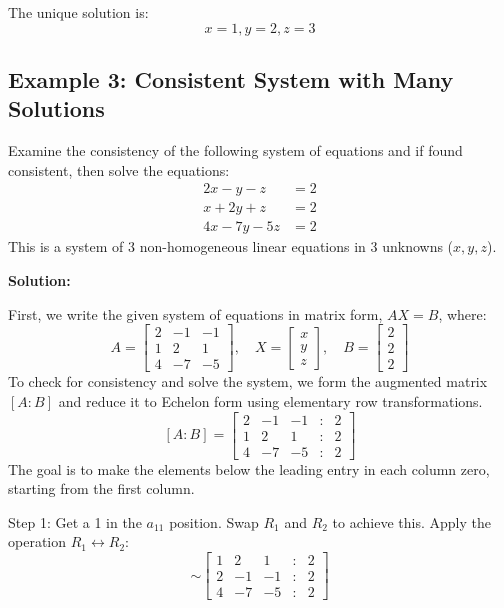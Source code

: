 \documentclass{article}
\begin{document}
The unique solution is:
\[ x=1, y=2, z=3 \]

\subsection{Example 3: Consistent System with Many Solutions} %
Examine the consistency of the following system of equations and if found consistent, then solve the equations:
\begin{align*} 2x - y - z &= 2 \\ x + 2y + z &= 2 \\ 4x - 7y - 5z &= 2 \end{align*}
This is a system of 3 non-homogeneous linear equations in 3 unknowns ($x, y, z$).

\textbf{Solution:}

First, we write the given system of equations in matrix form, $AX = B$, where:
\[ A = \begin{bmatrix} 2 & -1 & -1 \\ 1 & 2 & 1 \\ 4 & -7 & -5 \end{bmatrix}, \quad X = \begin{bmatrix} x \\ y \\ z \end{bmatrix}, \quad B = \begin{bmatrix} 2 \\ 2 \\ 2 \end{bmatrix} \]
To check for consistency and solve the system, we form the augmented matrix $[A:B]$ and reduce it to Echelon form using elementary row transformations.
\[ [A:B] = \begin{bmatrix} 2 & -1 & -1 & : & 2 \\ 1 & 2 & 1 & : & 2 \\ 4 & -7 & -5 & : & 2 \end{bmatrix} \]
The goal is to make the elements below the leading entry in each column zero, starting from the first column.

Step 1: Get a 1 in the $a_{11}$ position. Swap $R_1$ and $R_2$ to achieve this.
Apply the operation $R_1 \leftrightarrow R_2$:
\[ \sim \begin{bmatrix} 1 & 2 & 1 & : & 2 \\ 2 & -1 & -1 & : & 2 \\ 4 & -7 & -5 & : & 2 \end{bmatrix} \]
\end{document}
